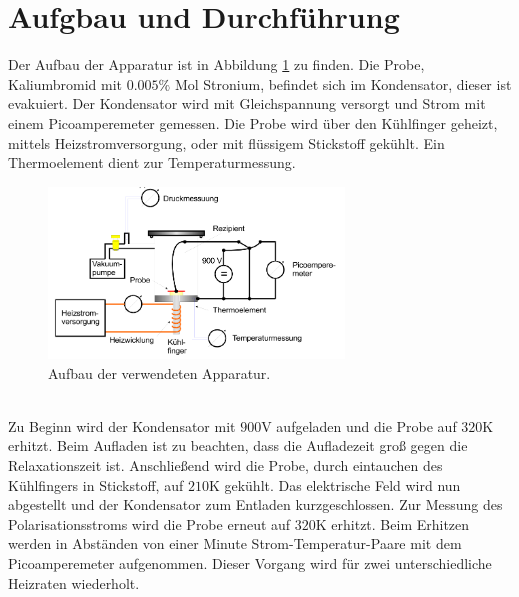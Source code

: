 \section{Aufgbau und Durchführung}
\label{sec:Durchführung}
Der Aufbau der Apparatur ist in Abbildung \ref{fig:aufbau}
zu finden. Die Probe, Kaliumbromid mit $0.005\%$ Mol Stronium, befindet sich im Kondensator,
dieser ist evakuiert.
Der Kondensator wird mit Gleichspannung versorgt und Strom mit einem Picoamperemeter gemessen.
Die Probe wird über den Kühlfinger geheizt, mittels Heizstromversorgung, oder mit flüssigem
Stickstoff gekühlt. Ein Thermoelement dient zur Temperaturmessung.
\begin{figure}
    \centering
    \includegraphics[width=0.7\textwidth]{aufbau.PNG}
    \caption{Aufbau der verwendeten Apparatur.\cite{skript}}
    \label{fig:aufbau}
\end{figure}\\
Zu Beginn wird der Kondensator mit $900\si{\volt}$ aufgeladen und die Probe auf $320\mathrm{K}$ erhitzt.
Beim Aufladen ist zu beachten, dass die Aufladezeit groß gegen die Relaxationszeit ist.
Anschließend wird die Probe, durch eintauchen des Kühlfingers in Stickstoff,
auf $210\mathrm{K}$ gekühlt.
Das elektrische Feld wird nun abgestellt und der Kondensator zum Entladen kurzgeschlossen.
Zur Messung des Polarisationsstroms wird die Probe erneut auf $320\mathrm{K}$ erhitzt.
Beim Erhitzen werden in Abständen von einer Minute Strom-Temperatur-Paare mit dem Picoamperemeter aufgenommen.
Dieser Vorgang wird für zwei unterschiedliche Heizraten wiederholt.
